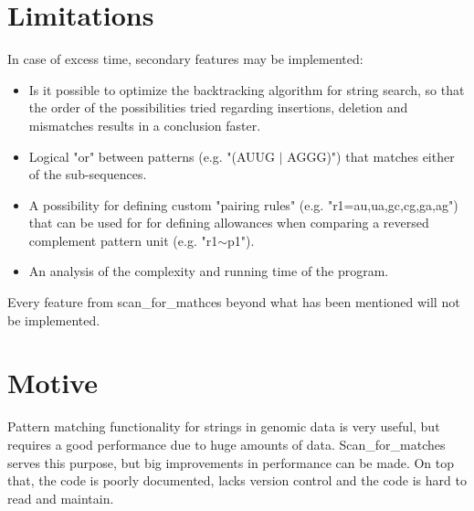 \documentclass[12pt]{article}
\begin{document}
\section{Limitations}
In case of excess time, secondary features may be implemented: 
\begin{itemize}
\item Is it possible to optimize the backtracking algorithm for string search, so that the order of the possibilities 
tried regarding insertions, deletion and mismatches results in a conclusion faster.
\item Logical "or" between patterns (e.g. "(AUUG $|$ AGGG)") that matches either of the sub-sequences.
\item A possibility for defining custom "pairing rules" (e.g. "r1={au,ua,gc,cg,ga,ag}") that can be used for 
for defining allowances when comparing a reversed complement pattern unit (e.g. "r1$\sim$p1").
\item An analysis of the complexity and running time of the program.
\end{itemize}
Every feature from scan\_for\_mathces beyond what has been mentioned will not be implemented.
\section{Motive}
Pattern matching functionality for strings in genomic data is very useful, 
but requires a good performance due to huge amounts of data. 
Scan\_for\_matches serves this purpose, but big improvements in performance can be made.
On top that, the code is poorly documented, lacks version control and the code is hard to read and maintain.
\end{document}
